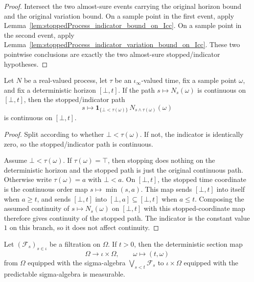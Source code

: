 \begin{proof}
Intersect the two almost-sure events carrying the original horizon bound and
the original variation bound.  On a sample point in the first event, apply
Lemma~\ref{lem:stoppedProcess_indicator_bound_on_Icc}.  On a sample point in
the second event, apply
Lemma~\ref{lem:stoppedProcess_indicator_variation_bound_on_Icc}.  These two
pointwise conclusions are exactly the two almost-sure stopped/indicator
hypotheses.
\end{proof}

\begin{lemma}\label{lem:stoppedProcess_indicator_continuousOn_Icc}
Let \(N\) be a real-valued process, let \(\tau\) be an
\(\iota_\infty\)-valued time, fix a sample point \(\omega\), and fix a
deterministic horizon \([\bot,t]\).  If the path
\(s\mapsto N_s(\omega)\) is continuous on \([\bot,t]\), then the
stopped/indicator path
\[
  s\longmapsto
  \mathbf 1_{\{\bot<\tau(\omega)\}}\,
  N_{s\wedge\tau(\omega)}(\omega)
\]
is continuous on \([\bot,t]\).
\end{lemma}

\begin{proof}
Split according to whether \(\bot<\tau(\omega)\).  If not, the indicator is
identically zero, so the stopped/indicator path is continuous.

Assume \(\bot<\tau(\omega)\).  If \(\tau(\omega)=\top\), then stopping does
nothing on the deterministic horizon and the stopped path is just the
original continuous path.  Otherwise write \(\tau(\omega)=a\) with
\(\bot<a\).  On \([\bot,t]\), the stopped time coordinate is the continuous
order map \(s\mapsto \min(s,a)\).  This map sends \([\bot,t]\) into itself
when \(a\ge t\), and sends \([\bot,t]\) into \([\bot,a]\subseteq[\bot,t]\)
when \(a\le t\).  Composing the assumed continuity of
\(s\mapsto N_s(\omega)\) on \([\bot,t]\) with this stopped-coordinate map
therefore gives continuity of the stopped path.  The indicator is the
constant value \(1\) on this branch, so it does not affect continuity.
\end{proof}


\begin{lemma}\label{lem:Filtration.measurable_prod_mk_predictable_past}
Let \((\mathcal F_s)_{s\in\iota}\) be a filtration on \(\Omega\).  If
\(t>0\), then the deterministic section map
\[
  \Omega\longrightarrow \iota\times\Omega,\qquad
  \omega\longmapsto (t,\omega)
\]
from \(\Omega\) equipped with the sigma-algebra
\(\bigvee_{s<t}\mathcal F_s\) to \(\iota\times\Omega\) equipped with the
predictable sigma-algebra is measurable.
\end{lemma}

